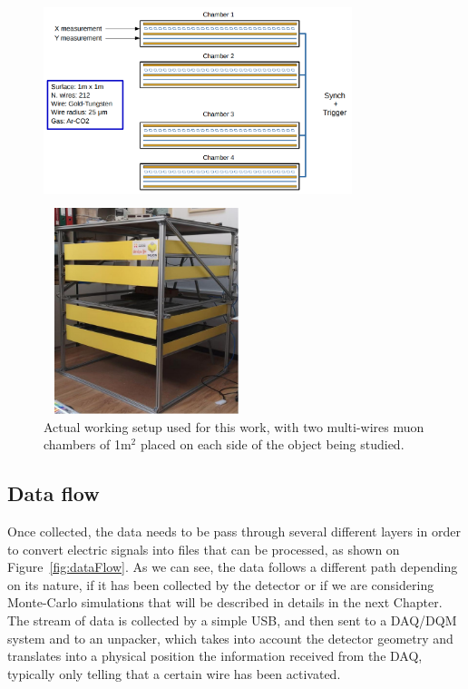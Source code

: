 \documentclass[a4paper, 11pt]{report}
\begin{document}
\begin{figure}[htbp]
\centering
\begin{minipage}[b]{.59\textwidth}
\includegraphics[width=9cm, height=6cm]{figs/muonChambers.png}
\end{minipage}\hfill
\begin{minipage}[b]{.39\textwidth}
\includegraphics[width=6cm, height=6cm]{figs/muonChambersPhoto.png}
\end{minipage} \hfill
\caption{Actual working setup used for this work, with two multi-wires muon chambers of 1m$^2$ placed on each side of the object being studied.}
\label{fig:setup}
\end{figure}

\subsection{Data flow} \label{sec:dataFlow}

Once collected, the data needs to be pass through several different layers in order to convert electric signals into files that can be processed, as shown on Figure~\ref{fig:dataFlow}. As we can see, the data follows a different path depending on its nature, if it has been collected by the detector or if we are considering Monte-Carlo simulations that will be described in details in the next Chapter. The stream of data is collected by a simple USB, and then sent to a DAQ/DQM system and to an unpacker, which takes into account the detector geometry and translates into a physical position the information received from the DAQ, typically only telling that a certain wire has been activated.
\end{document}
